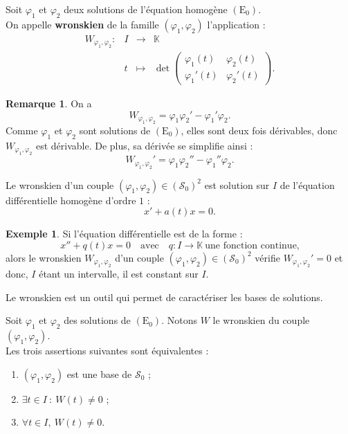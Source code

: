 \documentclass[french]{article}
\newcommand{\K}{\mathbb{K}}
\theoremstyle{plain}
\theoremstyle{definition}
\newtheorem*{ex}{Exemple}
\newtheorem*{rmq}{Remarque}
\theoremstyle{remark}
\begin{document}
\begin{dfn}
	Soit $\varphi_1$ et $\varphi_2$ deux solutions de l'équation homogène $(\text{E}_0)$. \\
	On appelle \textbf{wronskien} de la famille $(\varphi_1,\varphi_2)$ l'application :
	$$\begin{array}{lrcl}
		W_{\varphi_1,\varphi_2}:&I&\longrightarrow&\K\\
		&t&\longmapsto&\displaystyle\det\begin{pmatrix}
			\varphi_1(t)&\varphi_2(t)\\
			\varphi_1'(t)&\varphi_2'(t)
		\end{pmatrix}.
	\end{array}$$
\end{dfn}

\begin{rmq}
	On a $$W_{\varphi_1,\varphi_2}=\varphi_1\varphi_2'-\varphi_1'\varphi_2.$$
	Comme $\varphi_1$ et $\varphi_2$ sont solutions de $(\text{E}_0)$, elles sont deux fois dérivables, donc $W_{\varphi_1,\varphi_2}$ est dérivable. De plus, sa dérivée se simplifie ainsi :
	$$W_{\varphi_1,\varphi_2}'=\varphi_1\varphi_2''-\varphi_1''\varphi_2.$$
\end{rmq}

\begin{prop}%
	Le wronskien d'un couple $(\varphi_1,\varphi_2)\in(\mathcal{S}_0)^2$ est solution sur $I$ de l'équation différentielle homogène d'ordre $1$ :
	$$x'+a(t)x=0.$$
\end{prop}

\begin{ex}
	Si l'équation différentielle est de la forme :
	$$x''+q(t)x=0\quad\text{avec}\quad q:I\to\K\ \text{une fonction continue,}$$
	alors le wronskien $W_{\varphi_1,\varphi_2}$ d'un couple $(\varphi_1,\varphi_2)\in(\mathcal{S}_0)^2$ vérifie $W_{\varphi_1,\varphi_2}'=0$ et donc, $I$ étant un intervalle, il est constant sur $I$.
\end{ex}

Le wronskien est un outil qui permet de caractériser les bases de solutions.

\begin{prop}%
	Soit $\varphi_1$ et $\varphi_2$ des solutions de $(\text{E}_0)$. Notons $W$ le wronskien du couple $(\varphi_1,\varphi_2)$.\\
	Les trois assertions suivantes sont équivalentes :
	\begin{enumerate}[label=(\roman*)]
		\item $(\varphi_1,\varphi_2)$ est une base de $\mathcal{S}_0$ ;
		\item $\exists t\in I\ :\ W(t)\ne 0$ ;
		\item $\forall t\in I,\ W(t)\ne0$.
	\end{enumerate}
\end{prop}
\end{document}
